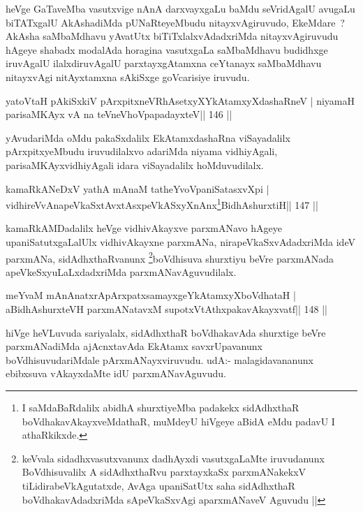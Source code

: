 \begin{artha}
heVge GaTaveMba vasutxvige nAnA darxvayxgaLu baMdu seVridAgalU avugaLu biTATxgalU AkAshadiMda pUNaRteyeMbudu nitayxvAgiruvudo, EkeMdare~? AkAsha saMbaMdhavu yAvatUtx biTiTxlalxvAdadxriMda nitayxvAgiruvudu hAgeye shabadx modalAda horagina vasutxgaLa saMbaMdhavu budidhxge iruvAgalU ilalxdiruvAgalU parxtayxgAtamxna ceYtanayx saMbaMdhavu nitayxvAgi nitAyxtamxna sAkiSxge goVcarisiye iruvudu.
\end{artha}

\begin{shl}
yatoV\s taH pAkiSxkiV pArxpitxneVRhAsetxyXYkAtamxyXdashaRneV |
niyamaH parisaMKAyx vA na teVneVhoVpapadayxteV\hfill || 146 ||
\end{shl}

\begin{artha}
yAvudariMda oMdu pakaSxdalilx EkAtamxdashaRna viSayadalilx pArxpitxyeMbudu iruvudilalxvo adariMda niyama vidhiyAgali, parisaMKAyxvidhiyAgali idara viSayadalilx hoMduvudilalx.
\end{artha}


\begin{shl}
kamaRkANeDxV yathA mAnaM tatheYvoVpaniSatasxvXpi |
vidhireVvAnapeVkaSxtAvxtAsxpeVkASxyXnAnx\footnote{I saMdaBaRdalilx abidhA shurxtiyeMba padakekx sidAdhxthaR boVdhakavAkayxveMdathaR, muMdeyU hiVgeye aBidA eMdu padavU I athaRkikxde.}BidhAshurxtiH\hfill || 147 ||
\end{shl}

\begin{artha}
kamaRkAMDadalilx heVge vidhivAkayxve parxmANavo hAgeye upaniSatutxgaLalUlx vidhivAkayxne parxmANa, nirapeVkaSxvAdadxriMda ideV parxmANa, sidAdhxthaRvanunx \footnote{keVvala sidadhxvasutxvanunx dadhAyxdi vasutxgaLaMte iruvudanunx BoVdhisuvalilx A sidAdhxthaRvu parxtayxkaSx parxmANakekxV tiLidirabeVkAgutatxde, AvAga upaniSatUtx saha sidAdhxthaR boVdhakavAdadxriMda sApeVkaSxvAgi aparxmANaveV Aguvudu ||}boVdhisuva shurxtiyu beVre parxmANada apeVkeSxyuLaLxdadxriMda parxmANavAguvudilalx.
\end{artha}


\begin{shl}
meYvaM mAnAnatxrApArxpatxsamayxgeYkAtamxyXboVdhataH |
aBidhAshurxteVH parxmANatavxM supotxVtAthxpakavAkayxvatf\hfill || 148 ||
\end{shl}

\begin{artha}
hiVge heVLuvuda sariyalalx, sidAdhxthaR boVdhakavAda shurxtige beVre parxmANadiMda ajAcnxtavAda EkAtamx savxrUpavanunx boVdhisuvudariMdale pArxmANayxviruvudu. udA:- malagidavananunx ebibxsuva vAkayxdaMte idU parxmANavAguvudu.
\end{artha}

